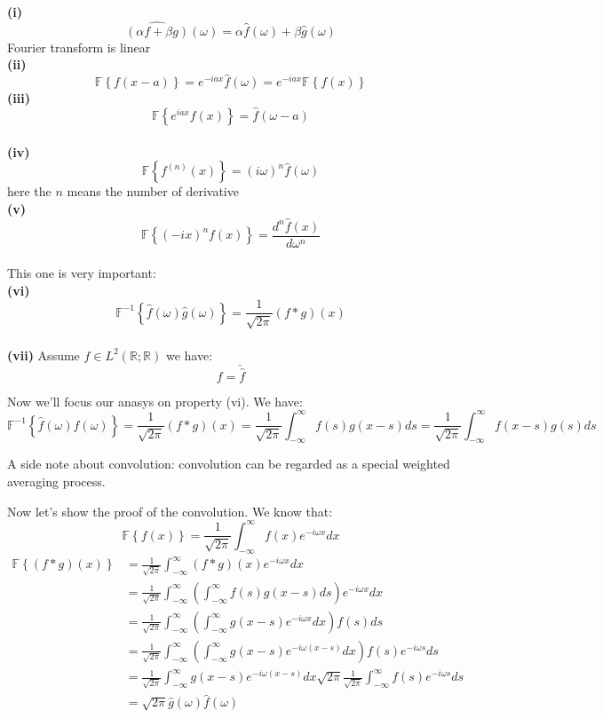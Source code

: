\documentclass[12pt]{article} %
\begin{document}
\textbf{(i)}  $$\hat{ (\alpha f + \beta g)} (\omega) = \alpha \hat{f}(\omega) + \beta \hat{g}(\omega)$$Fourier transform is linear\\
\textbf{(ii)} $$
\mathbb{F} \left\{f (x-a)\right\} =e^{-i a x}  \hat{f} (\omega) = e^{-i a x}\mathbb{F} \left\{f (x)\right\}
$$
\textbf{(iii)} $$
\mathbb{F} \left\{ e^{i a x} f (x)\right\} = \hat{f} (\omega - a)
$$\\
\textbf{(iv)}
$$
 \mathbb{F} \left\{ f^{(n)}(x)  \right\} = (i\omega)^{n}\hat{f}(\omega)
$$here the $n$ means the number of derivative\\
\textbf{(v)}
$$
\mathbb{F}  \left\{  (-ix)^{n}  f(x)  \right\} = \frac{d^{n} \hat{f}(x)}{d \omega^{n}}
$$\\
This one is very important:\\
\textbf{(vi)}
$$
\mathbb{F}^{-1}\left\{ \hat{f}(\omega) \hat{g}(\omega) \right\} = \frac{1}{\sqrt{2 \pi}}(f * g) (x)
$$\\
\textbf{(vii)}
Assume $f \in L^{2} (\mathbb{R}; \mathbb{R})$ we have:
$$
f = \check{\hat{f}}
$$\par
Now we'll focus our anasys on property (vi). We have:
$$
\mathbb{F}^{-1}\left\{ \hat{f}(\omega) \hat{f}(\omega) \right\} = \frac{1}{\sqrt{2 \pi}}(f * g) (x) = \frac{1}{\sqrt{2 \pi}} \int_{-\infty}^{\infty} f(s) g(x -s) ds = \frac{1}{\sqrt{2 \pi}} \int_{-\infty}^{\infty} f(x-s) g(s) ds 
$$\par
A side note about convolution: convolution can be regarded as a special weighted averaging  process. \par
Now let's show the proof of the convolution. We know that:
$$
\mathbb{F}\left\{ f (x) \right\} =\frac{1}{\sqrt{2 \pi}} \int_{-\infty}^{\infty} f(x) e^{-i \omega x}dx
$$
\begin{align*}
\mathbb{F}\left\{ (f * g) (x) \right\} &=\frac{1}{\sqrt{2 \pi}} \int_{-\infty}^{\infty} (f * g) (x) e^{-i \omega x}dx \\
&=\frac{1}{\sqrt{2 \pi}} \int_{-\infty}^{\infty} \left( \int_{-\infty}^{\infty} f(s) g(x -s) ds  \right) e^{-i \omega x}dx\\
&=\frac{1}{\sqrt{2 \pi}} \int_{-\infty}^{\infty}  \left(  \int_{-\infty}^{\infty} g(x -s)e^{-i \omega x}dx \right)f(s) ds\\
&= \frac{1}{\sqrt{2 \pi}} \int_{-\infty}^{\infty}  \left(  \int_{-\infty}^{\infty} g(x -s)e^{-i \omega (x - s)}dx \right)f(s)e^{-i \omega   s} ds\\
&= \frac{1}{\sqrt{2 \pi}}  \int_{-\infty}^{\infty} g(x -s)e^{-i \omega (x - s)}dx  \sqrt{2 \pi}\frac{1}{\sqrt{2 \pi}}\int_{-\infty}^{\infty} f(s)e^{-i \omega  s}ds\\
&= \sqrt{2 \pi} \hat{g}(\omega)\hat{f}(\omega)
\end{align*}\par
\end{document}

